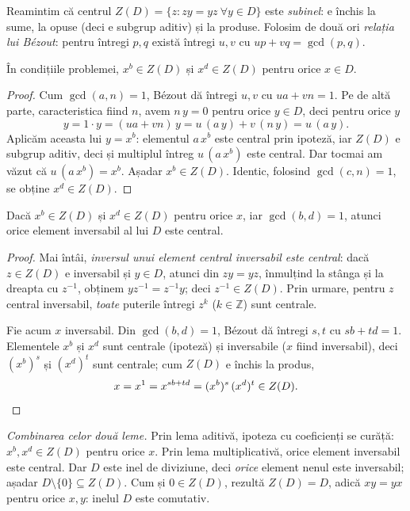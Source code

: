 \begin{solutie}
Reamintim că centrul $Z(D)=\{z : zy=yz\ \forall y\in D\}$ este
\emph{subinel}: e închis la sume, la opuse (deci e subgrup aditiv) și
la produse. Folosim de două ori \emph{relația lui Bézout}: pentru
întregi $p,q$ există întregi $u,v$ cu $up+vq=\gcd(p,q)$.

\begin{lemat}
În condițiile problemei, $x^{b}\in Z(D)$ și $x^{d}\in Z(D)$
pentru orice $x\in D$.
\end{lemat}

\begin{proof}
Cum $\gcd(a,n)=1$, Bézout dă întregi $u,v$ cu $ua+vn=1$. Pe de
altă parte, caracteristica fiind $n$, avem $n\,y=0$ pentru orice $y\in D$,
deci pentru orice $y$
\[
  y=1\cdot y=(ua+vn)\,y=u\,(a\,y)+v\,(n\,y)=u\,(a\,y).
\]
Aplicăm aceasta lui $y=x^{b}$: elementul $a\,x^{b}$ este central prin
ipoteză, iar $Z(D)$ e subgrup aditiv, deci și multiplul întreg
$u\,(a\,x^{b})$ este central. Dar tocmai am văzut că
$u\,(a\,x^{b})=x^{b}$. Așadar $x^{b}\in Z(D)$. Identic, folosind
$\gcd(c,n)=1$, se obține $x^{d}\in Z(D)$.
\end{proof}

\begin{lemat}
Dacă $x^{b}\in Z(D)$ și $x^{d}\in Z(D)$ pentru orice $x$, iar
$\gcd(b,d)=1$, atunci orice element inversabil al lui $D$ este central.
\end{lemat}

\begin{proof}
Mai întâi, \emph{inversul unui element central inversabil este
central}: dacă $z\in Z(D)$ e inversabil și $y\in D$, atunci din
$zy=yz$, înmulțind la stânga și la dreapta cu $z^{-1}$,
obținem $yz^{-1}=z^{-1}y$; deci $z^{-1}\in Z(D)$. Prin urmare, pentru
$z$ central inversabil, \emph{toate} puterile întregi $z^{k}$
($k\in\mathbb{Z}$) sunt centrale.

Fie acum $x$ inversabil. Din $\gcd(b,d)=1$, Bézout dă întregi
$s,t$ cu $sb+td=1$. Elementele $x^{b}$ și $x^{d}$ sunt centrale (ipoteză)
și inversabile ($x$ fiind inversabil), deci $(x^{b})^{s}$ și
$(x^{d})^{t}$ sunt centrale; cum $Z(D)$ e închis la produs,
\[
  x=x^{1}=x^{sb+td}=(x^{b})^{s}\,(x^{d})^{t}\in Z(D). \qedhere
\]
\end{proof}

\smallskip
\textit{Combinarea celor două leme.} Prin lema aditivă, ipoteza cu
coeficienți se curăță: $x^{b},x^{d}\in Z(D)$ pentru orice $x$.
Prin lema multiplicativă, orice element inversabil este central. Dar $D$
este inel de diviziune, deci \emph{orice} element nenul este inversabil;
așadar $D\setminus\{0\}\subseteq Z(D)$. Cum și $0\in Z(D)$, rezultă
$Z(D)=D$, adică $xy=yx$ pentru orice $x,y$: inelul $D$ este comutativ.
\end{solutie}

